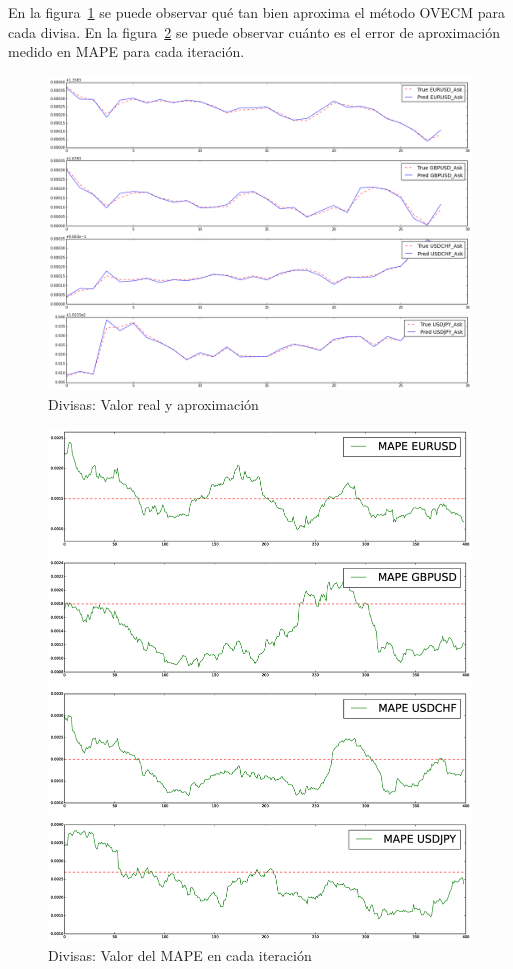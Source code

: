 En la figura~\ref{fig:accuracy} se puede observar qué tan bien aproxima el
método OVECM para cada divisa. En la figura~\ref{fig:mapes} se puede observar
cuánto es el error de aproximación medido en MAPE para cada iteración.

\begin{figure}[h!t]
    \begin{center}
        \includegraphics[width=\textwidth]{images/y_vs_yhat}
        \caption{Divisas: Valor real y aproximación}
        \label{fig:accuracy}
    \end{center}
\end{figure}


\begin{figure}[h!t]
    \begin{center}
        \includegraphics[width=\textwidth]{images/mapes}
        \caption{Divisas: Valor del MAPE en cada iteración}
        \label{fig:mapes}
    \end{center}
\end{figure}
